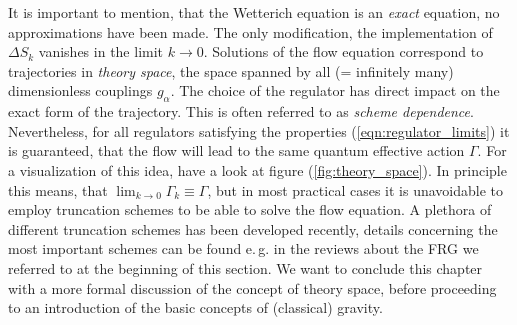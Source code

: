 It is important to mention, that the Wetterich equation is an \textit{exact} equation, no approximations have been made. The only modification, the implementation of $\Delta S_k$ vanishes in the limit $k\rightarrow 0$. Solutions of the flow equation correspond to trajectories in \textit{theory space}, the space spanned by all (= infinitely many) dimensionless couplings $g_{\alpha}$. The choice of the regulator has direct impact on the exact form of the trajectory. This is often referred to as \textit{scheme dependence}. Nevertheless, for all regulators satisfying the properties (\ref{eqn:regulator_limits}) it is guaranteed, that the flow will lead to the same quantum effective action $\Gamma$. For a visualization of this idea, have a look at figure (\ref{fig:theory_space}).  In principle this means, that $\lim_{k\rightarrow 0}\Gamma_k\equiv\Gamma$, but in most practical cases it is unavoidable to employ truncation schemes to be able to solve the flow equation. A plethora of different truncation schemes has been developed recently, details concerning the most important schemes can be found e.\,g. in the reviews about the FRG we referred to at the beginning of this section. We want to conclude this chapter with a more formal discussion of the concept of theory space, before proceeding to an introduction of the basic concepts of (classical) gravity.
